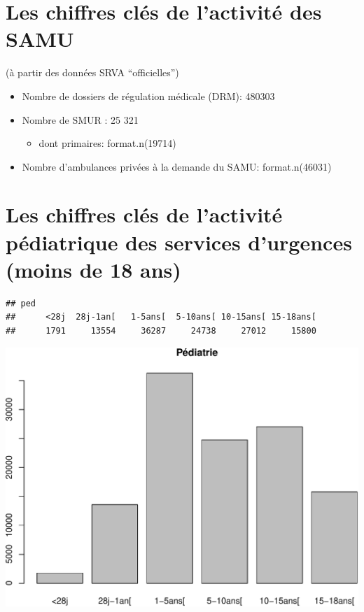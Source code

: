 \documentclass[]{article}
\begin{document}
\section{Les chiffres clés de l'activité des
SAMU}\label{les-chiffres-cles-de-lactivite-des-samu}

(à partir des données SRVA ``officielles'')

\begin{itemize}
\itemsep1pt\parskip0pt
\item
  Nombre de dossiers de régulation médicale (DRM): 480303
\item
  Nombre de SMUR : 25 321

  \begin{itemize}
  \itemsep1pt\parskip0pt
  \item
    dont primaires: format.n(19714)
  \end{itemize}
\item
  Nombre d'ambulances privées à la demande du SAMU: format.n(46031)
\end{itemize}

\section{Les chiffres clés de l'activité pédiatrique des services
d'urgences (moins de 18
ans)}\label{les-chiffres-cles-de-lactivite-pediatrique-des-services-durgences-moins-de-18-ans}

\begin{verbatim}
## ped
##      <28j  28j-1an[   1-5ans[  5-10ans[ 10-15ans[ 15-18ans[ 
##      1791     13554     36287     24738     27012     15800
\end{verbatim}

\includegraphics{rapport2014_V4_files/figure-latex/pop18-1.pdf}
\end{document}
